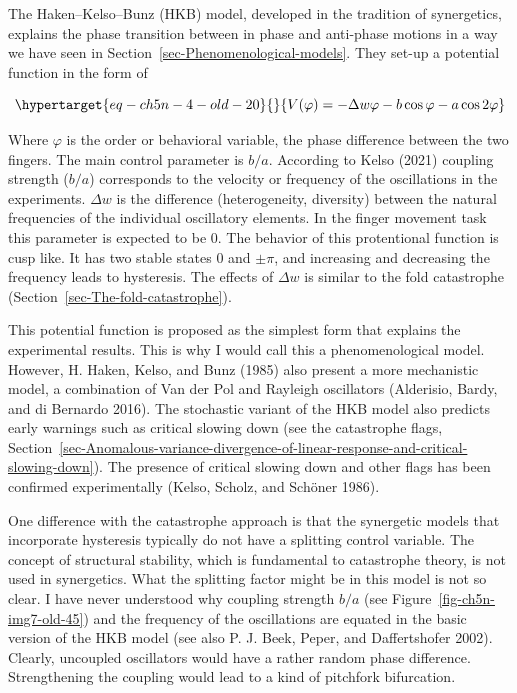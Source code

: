 \documentclass[
  a4paper,
  DIV=11,
  numbers=noendperiod]{scrreprt}
\begin{document}
The Haken--Kelso--Bunz (HKB) model, developed in the tradition of
synergetics, explains the phase transition between in phase and
anti-phase motions in a way we have seen in
Section~\ref{sec-Phenomenological-models}. They set-up a potential
function in the form of

\begin{equation}\protect\hypertarget{eq-ch5n-4-old-20}{}{
V(\varphi) = - \Delta w\varphi - b\cos\varphi - a\cos{2\varphi}}\label{eq-ch5n-4-old-20}\end{equation}

Where \(\varphi\) is the order or behavioral variable, the phase
difference between the two fingers. The main control parameter is
\(b/a\). According to Kelso (2021) coupling strength (\(b/a\))
corresponds to the velocity or frequency of the oscillations in the
experiments. \(\Delta w\) is the difference (heterogeneity, diversity)
between the natural frequencies of the individual oscillatory elements.
In the finger movement task this parameter is expected to be 0. The
behavior of this protentional function is cusp like. It has two stable
states 0 and \(\pm \pi\), and increasing and decreasing the frequency
leads to hysteresis. The effects of \(\Delta w\) is similar to the fold
catastrophe (Section~\ref{sec-The-fold-catastrophe}).

This potential function is proposed as the simplest form that explains
the experimental results. This is why I would call this a
phenomenological model. However, H. Haken, Kelso, and Bunz (1985) also
present a more mechanistic model, a combination of Van der Pol and
Rayleigh oscillators (Alderisio, Bardy, and di Bernardo 2016). The
stochastic variant of the HKB model also predicts early warnings such as
critical slowing down (see the catastrophe flags,
Section~\ref{sec-Anomalous-variance-divergence-of-linear-response-and-critical-slowing-down}).
The presence of critical slowing down and other flags has been confirmed
experimentally (Kelso, Scholz, and Schöner 1986).

One difference with the catastrophe approach is that the synergetic
models that incorporate hysteresis typically do not have a splitting
control variable. The concept of structural stability, which is
fundamental to catastrophe theory, is not used in synergetics. What the
splitting factor might be in this model is not so clear. I have never
understood why coupling strength \(b/a\) (see
Figure~\ref{fig-ch5n-img7-old-45}) and the frequency of the oscillations
are equated in the basic version of the HKB model (see also P. J. Beek,
Peper, and Daffertshofer 2002). Clearly, uncoupled oscillators would
have a rather random phase difference. Strengthening the coupling would
lead to a kind of pitchfork bifurcation.
\end{document}
